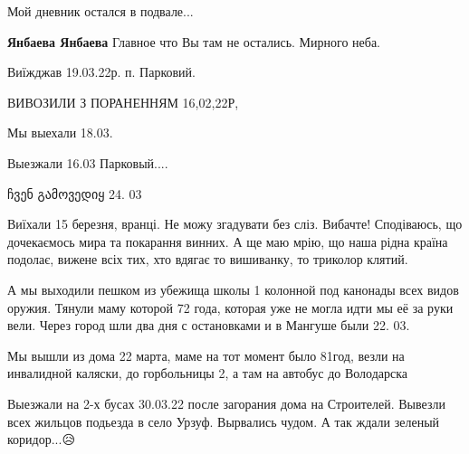  
 
 
 
 

\qqSecCmt


Мой дневник остался в подвале...

\begin{itemize} %
\textbf{Янбаева Янбаева} Главное что Вы там не остались. Мирного неба.
\end{itemize} %


Виїжджав 19.03.22р. п. Парковий.


ВИВОЗИЛИ З ПОРАНЕННЯМ 16,02,22Р,


Мы выехали 18.03.


Выезжали 16.03 Парковый....


ჩვენ გამოვედიყ 24. 03


Виїхали 15 березня, вранці. Не можу згадувати без сліз. Вибачте! Сподіваюсь, що
дочекаємось мира та покарання винних. А ще маю мрію, що наша рідна країна
подолає, вижене всіх тих, хто вдягає то вишиванку, то триколор клятий.


А мы выходили пешком из убежища школы 1 колонной под канонады всех видов
оружия. Тянули маму которой 72 года, которая уже не могла идти мы её за руки
вели. Через город шли два дня с остановками и в Мангуше были 22. 03.


Мы вышли из дома 22 марта, маме на тот момент было 81год, везли на инвалидной
каляски, до горбольницы 2, а там на автобус до Володарска


Выезжали на 2-х бусах 30.03.22 после загорания дома на Строителей. Вывезли всех
жильцов подьезда в село Урзуф. Вырвались чудом. А так ждали зеленый
коридор...😥

